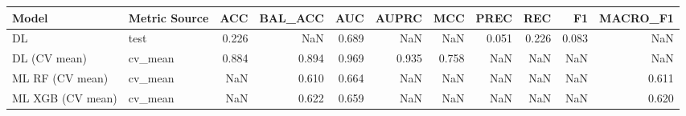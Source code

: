 \begin{tabular}{llrrrrrrrrr}
\toprule
Model & Metric Source & ACC & BAL_ACC & AUC & AUPRC & MCC & PREC & REC & F1 & MACRO_F1 \\
\midrule
DL & test & 0.226 & NaN & 0.689 & NaN & NaN & 0.051 & 0.226 & 0.083 & NaN \\
DL (CV mean) & cv_mean & 0.884 & 0.894 & 0.969 & 0.935 & 0.758 & NaN & NaN & NaN & NaN \\
ML RF (CV mean) & cv_mean & NaN & 0.610 & 0.664 & NaN & NaN & NaN & NaN & NaN & 0.611 \\
ML XGB (CV mean) & cv_mean & NaN & 0.622 & 0.659 & NaN & NaN & NaN & NaN & NaN & 0.620 \\
\bottomrule
\end{tabular}
